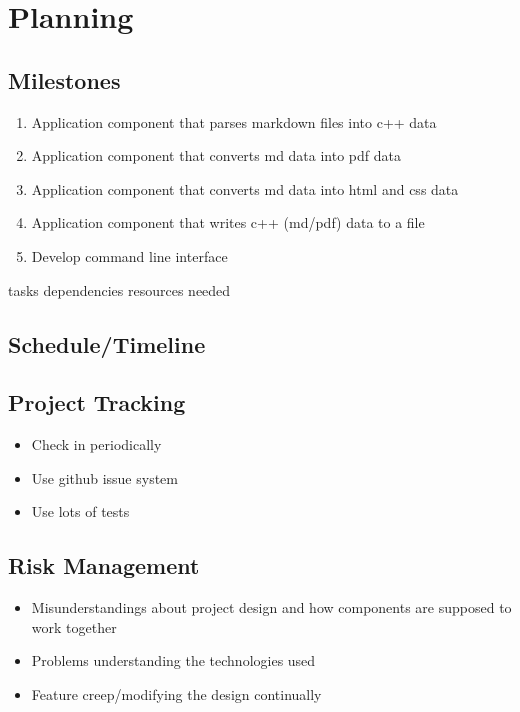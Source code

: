 \section{Planning}

\subsection{Milestones}
\begin{enumerate}
	\item Application component that parses markdown files into c++ data
	\item Application component that converts md data into pdf data
	\item Application component that converts md data into html and css data
	\item Application component that writes c++ (md/pdf) data to a file
	\item Develop command line interface
\end{enumerate}


tasks
dependencies
resources needed

\subsection{Schedule/Timeline}


\subsection{Project Tracking}
\begin{itemize}
	\item Check in periodically
	\item Use github issue system
	\item Use lots of tests
\end{itemize}

\subsection{Risk Management}
\begin{itemize}
	\item Misunderstandings about project design and how components are supposed to work together
	\item Problems understanding the technologies used
	\item Feature creep/modifying the design continually
\end{itemize}